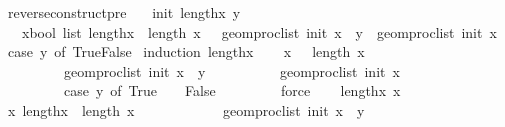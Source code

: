 \begin{isabellebody}
\isanewline
\isanewline
{}\isamarkupfalse%
\ reverse{\isacharunderscore}{\kern0pt}construct{\isacharunderscore}{\kern0pt}pre{\isacharcolon}{\kern0pt}\isanewline
\ \ \ init\ lengthx\ y\isanewline
\ \ \ {\isachardoublequoteopen}{\isasymAnd}x{\isacharcolon}{\kern0pt}{\isacharcolon}{\kern0pt}bool\ list{\isachardot}{\kern0pt}\ lengthx\ {\isacharequal}{\kern0pt}\ length\ x\ {\isasymLongrightarrow}\ \ geom{\isacharunderscore}{\kern0pt}proc{\isacharunderscore}{\kern0pt}list\ init\ {\isacharparenleft}{\kern0pt}x\ {\isacharat}{\kern0pt}\ {\isacharbrackleft}{\kern0pt}y{\isacharbrackright}{\kern0pt}{\isacharparenright}{\kern0pt}\ {\isacharequal}{\kern0pt}\ geom{\isacharunderscore}{\kern0pt}proc{\isacharunderscore}{\kern0pt}list\ init\ x\ {\isacharplus}{\kern0pt}\ {\isacharparenleft}{\kern0pt}case\ y\ of\ True{\isasymRightarrow}{}{\isacharbar}{\kern0pt}False{\isasymRightarrow}\ {\isacharminus}{\kern0pt}{}{\isacharparenright}{\kern0pt}{\isachardoublequoteclose}\isanewline
%
\isadelimproof
%
\endisadelimproof
%
\isatagproof
{}\isamarkupfalse%
{\isacharparenleft}{\kern0pt}induction\ {\isachardoublequoteopen}lengthx{\isachardoublequoteclose}{\isacharparenright}{\kern0pt}\isanewline
\ \ \isamarkupfalse%
\ {\isachardoublequoteopen}{\isasymAnd}x{\isachardot}{\kern0pt}\ {}\ {\isacharequal}{\kern0pt}\ length\ x\ {\isasymLongrightarrow}\isanewline
\ \ \ \ \ \ \ \ \ geom{\isacharunderscore}{\kern0pt}proc{\isacharunderscore}{\kern0pt}list\ init\ {\isacharparenleft}{\kern0pt}x\ {\isacharat}{\kern0pt}\ {\isacharbrackleft}{\kern0pt}y{\isacharbrackright}{\kern0pt}{\isacharparenright}{\kern0pt}\ {\isacharequal}{\kern0pt}\isanewline
\ \ \ \ \ \ \ \ \ geom{\isacharunderscore}{\kern0pt}proc{\isacharunderscore}{\kern0pt}list\ init\ x\ {\isacharplus}{\kern0pt}\isanewline
\ \ \ \ \ \ \ \ \ {\isacharparenleft}{\kern0pt}case\ y\ of\ True\ {\isasymRightarrow}\ {}\ {\isacharbar}{\kern0pt}\ False\ {\isasymRightarrow}\ {\isacharminus}{\kern0pt}\ {}{\isacharparenright}{\kern0pt}{\isachardoublequoteclose}\isanewline
\ \ \ \ \isamarkupfalse%
\ force\isanewline
{}\isamarkupfalse%
\isanewline
\ \ \isamarkupfalse%
\ lengthx\ x\isanewline
\ \ \isamarkupfalse%
{\isachardoublequoteopen}\ {\isacharparenleft}{\kern0pt}{\isasymAnd}x{}{\isachardot}{\kern0pt}\ lengthx\ {\isacharequal}{\kern0pt}\ length\ x{}\ {\isasymLongrightarrow}\isanewline
\ \ \ \ \ \ \ \ \ \ \ geom{\isacharunderscore}{\kern0pt}proc{\isacharunderscore}{\kern0pt}list\ init\ {\isacharparenleft}{\kern0pt}x{}\ {\isacharat}{\kern0pt}\ {\isacharbrackleft}{\kern0pt}y{\isacharbrackright}{\kern0pt}{\isacharparenright}{\kern0pt}\ {\isacharequal}{\kern0pt}\isanewline

\end{isabellebody}
